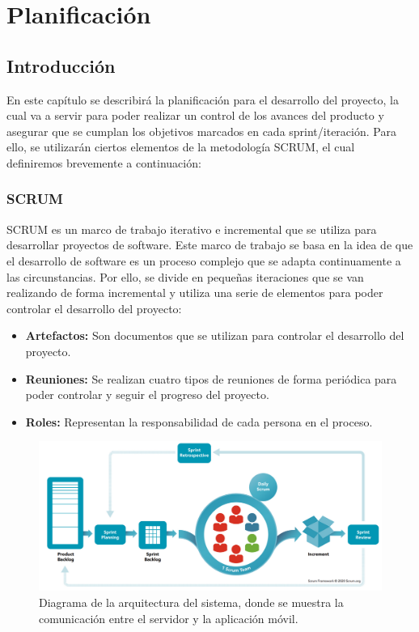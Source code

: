 \chapter{Planificación}

\section{Introducción}
En este capítulo se describirá la planificación para el desarrollo del proyecto, la cual va a servir para poder
realizar un control de los avances del producto y asegurar que se cumplan los objetivos marcados en cada sprint/iteración.
Para ello, se utilizarán ciertos elementos de la metodología SCRUM, el cual definiremos brevemente a continuación:



\subsection*{SCRUM}
SCRUM es un marco de trabajo iterativo e incremental que se utiliza para desarrollar proyectos de software.
Este marco de trabajo se basa en la idea de que el desarrollo de software es un proceso complejo que se adapta continuamente
a las circunstancias. Por ello, se divide en pequeñas iteraciones que se van realizando de forma incremental y utiliza una serie de elementos
para poder controlar el desarrollo del proyecto:
\begin{itemize}
    \item \textbf{Artefactos:} Son documentos que se utilizan para controlar el desarrollo del proyecto.
    \item \textbf{Reuniones: } Se realizan cuatro tipos de reuniones de forma periódica para poder controlar y seguir el progreso del proyecto.
    \item \textbf{Roles:} Representan la responsabilidad de cada persona en el proceso.
\end{itemize}

\hfill

\begin{figure}[H]
    \centering
    \centerline{\includegraphics[width=\textwidth]{imagenes/c4/scrum.png}}
    \caption{Diagrama de la arquitectura del sistema, donde se muestra la comunicación entre el servidor y la aplicación móvil.}
    \label{fig:diagramadearquitectura}    
\end{figure}


